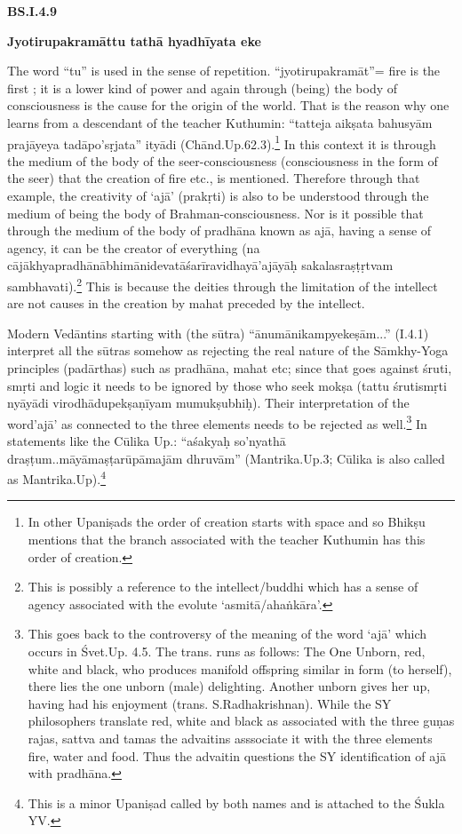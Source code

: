 \textbf{BS.I.4.9}

\textbf{Jyotirupakramāttu tathā hyadhīyata eke}

The word “tu” is used in the sense of repetition. “jyotirupakramāt”= fire is the first ; it is a lower kind of power and again through (being) the body of consciousness is the cause for the origin of the world. That is the reason why one learns from a descendant of the teacher Kuthumin: “tatteja aikṣata bahusyām prajāyeya tadāpo’sṛjata” ityādi (Chānd.Up.62.3).\footnote{In other Upaniṣads the order of creation starts with  space and so Bhikṣu  mentions that the branch associated with the teacher Kuthumin has this order of creation.} In this context it is through the medium of the body of the seer-consciousness (consciousness in the form of the seer) that the creation of fire etc., is mentioned. Therefore through that example, the creativity of ‘ajā’ (prakṛti) is also to be understood through the medium of being the body of Brahman-consciousness.  Nor is it possible that through the medium of the body of pradhāna known as ajā, having a sense of agency, it can be the creator of everything (na cājākhyapradhānābhimānidevatāśarīravidhayā’ajāyāḥ sakalasraṣṭṛtvam sambhavati).\footnote{This is possibly a reference to the intellect/buddhi which has a sense of agency associated with the evolute ‘asmitā/ahaṅkāra’.} This is because the deities through the limitation of the intellect are not causes in the creation by mahat preceded by the intellect.

Modern Vedāntins starting with (the sūtra) “ānumānikampyekeṣām...” (I.4.1)  interpret all the sūtras somehow as rejecting the real nature of the Sāmkhy-Yoga principles (padārthas) such as pradhāna, mahat etc; since that goes against śruti, smṛti and logic it needs to be ignored by those who seek mokṣa (tattu śrutismṛti nyāyādi virodhādupekṣaṇī\-yam mumukṣubhiḥ). Their interpretation of the word’ajā’ as connected to the three elements needs to be rejected as well.\footnote{This goes back to the controversy of the meaning of the word ‘ajā’ which occurs in Śvet.Up. 4.5. The trans. runs as follows: The One Unborn, red, white and black, who produces manifold offspring similar in form (to herself), there lies the one unborn (male) delighting. Another unborn gives her up, having had his enjoyment (trans. S.Radhakrishnan). While the SY philosophers translate red, white and black as associated with the three guṇas rajas, sattva and tamas the advaitins asssociate it with the three elements fire, water and food. Thus the advaitin questions the SY identification of ajā with pradhāna.} In statements like the Cūlika Up.: “aśakyaḥ so’nyathā draṣṭum..māyāmaṣṭarūpāmajām dhruvām” (Mantrika.Up.3; Cūlika is also called as Mantrika.Up).\footnote{This is a minor Upaniṣad called by both names and is attached to the Śukla YV.}

